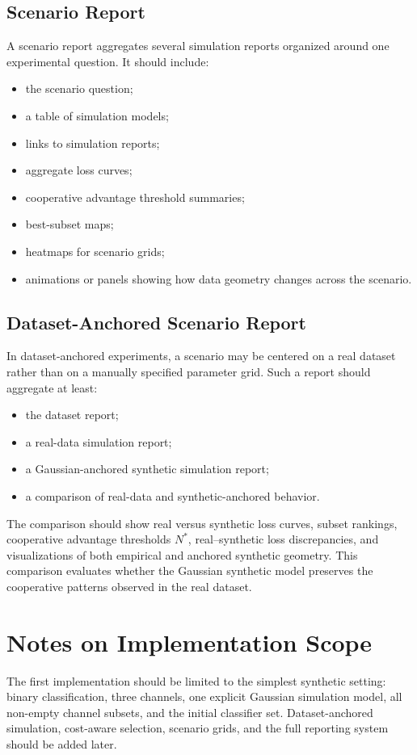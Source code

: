 \documentclass[11pt,a4paper]{article}
\begin{document}
\subsection{Scenario Report}

A scenario report aggregates several simulation reports organized around one experimental question. It should include:
\begin{itemize}
    \item the scenario question;
    \item a table of simulation models;
    \item links to simulation reports;
    \item aggregate loss curves;
    \item cooperative advantage threshold summaries;
    \item best-subset maps;
    \item heatmaps for scenario grids;
    \item animations or panels showing how data geometry changes across the scenario.
\end{itemize}

\subsection{Dataset-Anchored Scenario Report}

In dataset-anchored experiments, a scenario may be centered on a real dataset rather than on a manually specified parameter grid. Such a report should aggregate at least:
\begin{itemize}
    \item the dataset report;
    \item a real-data simulation report;
    \item a Gaussian-anchored synthetic simulation report;
    \item a comparison of real-data and synthetic-anchored behavior.
\end{itemize}

The comparison should show real versus synthetic loss curves, subset rankings, cooperative advantage thresholds $N^*$, real--synthetic loss discrepancies, and visualizations of both empirical and anchored synthetic geometry. This comparison evaluates whether the Gaussian synthetic model preserves the cooperative patterns observed in the real dataset.

\section{Notes on Implementation Scope}

The first implementation should be limited to the simplest synthetic setting: binary classification, three channels, one explicit Gaussian simulation model, all non-empty channel subsets, and the initial classifier set. Dataset-anchored simulation, cost-aware selection, scenario grids, and the full reporting system should be added later.
\end{document}
